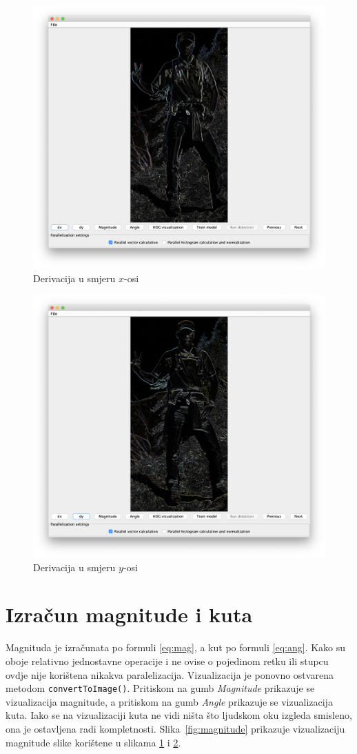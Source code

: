 \documentclass[times, utf8, zavrsni]{fer}
\begin{document}
\begin{figure}[htb]
	\centering
	\includegraphics[width=0.75\linewidth]{figures/dx.png}
	\caption{Derivacija u smjeru \(x\)-osi}
	\label{fig:dx}
\end{figure}

\begin{figure}[htb]
	\centering
	\includegraphics[width=0.75\linewidth]{figures/dy.png}
	\caption{Derivacija u smjeru \(y\)-osi}
	\label{fig:dy}
\end{figure}

\section{Izračun magnitude i kuta}
Magnituda je izračunata po formuli \ref{eq:mag}, a kut po formuli \ref{eq:ang}. Kako su oboje relativno jednostavne operacije i ne ovise o pojedinom retku ili stupcu ovdje nije korištena nikakva paralelizacija. Vizualizacija je ponovno ostvarena metodom \verb|convertToImage()|. Pritiskom na gumb \textit{Magnitude} prikazuje se vizualizacija magnitude, a pritiskom na gumb \textit{Angle} prikazuje se vizualizacija kuta. Iako se na vizualizaciji kuta ne vidi ništa što  ljudskom oku izgleda smisleno, ona je ostavljena radi kompletnosti. Slika~\ref{fig:magnitude} prikazuje vizualizaciju magnitude slike korištene u slikama \ref{fig:dx} i \ref{fig:dy}.
\end{document}
